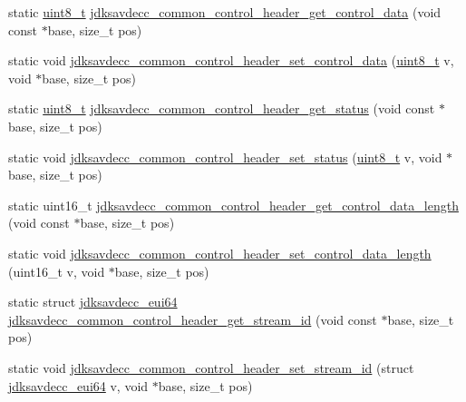 \begin{DoxyCompactItemize}
\item 
static \hyperlink{stdint_8h_aba7bc1797add20fe3efdf37ced1182c5}{uint8\+\_\+t} \hyperlink{group__jdksavdecc__avtp__common__control__header_gacb435e5d647474931972cb9eb93b4e41}{jdksavdecc\+\_\+common\+\_\+control\+\_\+header\+\_\+get\+\_\+control\+\_\+data} (void const $\ast$base, size\+\_\+t pos)
\item 
static void \hyperlink{group__jdksavdecc__avtp__common__control__header_gaaa8fc67df8a6ca2ae198b00d444c2d02}{jdksavdecc\+\_\+common\+\_\+control\+\_\+header\+\_\+set\+\_\+control\+\_\+data} (\hyperlink{stdint_8h_aba7bc1797add20fe3efdf37ced1182c5}{uint8\+\_\+t} v, void $\ast$base, size\+\_\+t pos)
\item 
static \hyperlink{stdint_8h_aba7bc1797add20fe3efdf37ced1182c5}{uint8\+\_\+t} \hyperlink{group__jdksavdecc__avtp__common__control__header_ga4a4d44fa74bdb873eab982d74862273c}{jdksavdecc\+\_\+common\+\_\+control\+\_\+header\+\_\+get\+\_\+status} (void const $\ast$base, size\+\_\+t pos)
\item 
static void \hyperlink{group__jdksavdecc__avtp__common__control__header_ga1eb286068111e77cc1088b32a7517d76}{jdksavdecc\+\_\+common\+\_\+control\+\_\+header\+\_\+set\+\_\+status} (\hyperlink{stdint_8h_aba7bc1797add20fe3efdf37ced1182c5}{uint8\+\_\+t} v, void $\ast$base, size\+\_\+t pos)
\item 
static uint16\+\_\+t \hyperlink{group__jdksavdecc__avtp__common__control__header_ga2d89ba7b9520f61839d222bdb2494e24}{jdksavdecc\+\_\+common\+\_\+control\+\_\+header\+\_\+get\+\_\+control\+\_\+data\+\_\+length} (void const $\ast$base, size\+\_\+t pos)
\item 
static void \hyperlink{group__jdksavdecc__avtp__common__control__header_ga69f3cbdf2665d0649d4669b2b5d07b61}{jdksavdecc\+\_\+common\+\_\+control\+\_\+header\+\_\+set\+\_\+control\+\_\+data\+\_\+length} (uint16\+\_\+t v, void $\ast$base, size\+\_\+t pos)
\item 
static struct \hyperlink{structjdksavdecc__eui64}{jdksavdecc\+\_\+eui64} \hyperlink{group__jdksavdecc__avtp__common__control__header_ga99181000ee374936c8518f657fa9f5cd}{jdksavdecc\+\_\+common\+\_\+control\+\_\+header\+\_\+get\+\_\+stream\+\_\+id} (void const $\ast$base, size\+\_\+t pos)
\item 
static void \hyperlink{group__jdksavdecc__avtp__common__control__header_ga162c572e62c324dab4911f46e750e261}{jdksavdecc\+\_\+common\+\_\+control\+\_\+header\+\_\+set\+\_\+stream\+\_\+id} (struct \hyperlink{structjdksavdecc__eui64}{jdksavdecc\+\_\+eui64} v, void $\ast$base, size\+\_\+t pos)

\end{DoxyCompactItemize}
